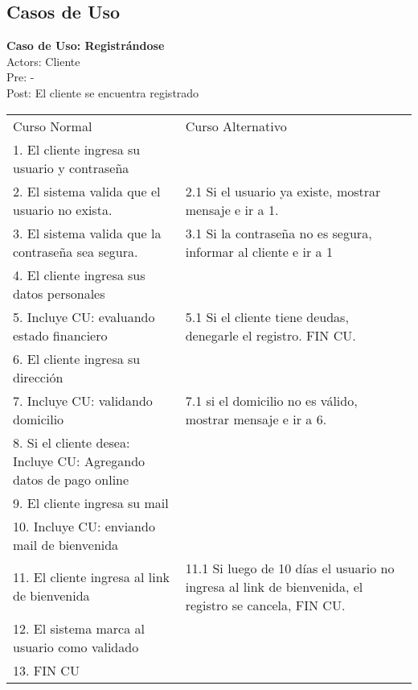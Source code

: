 \subsection{Casos de Uso}

\newcommand{\cutitle}[1]{\renewcommand{\givencutitle}{#1}}
\newcommand{\cuactors}[1]{\renewcommand{\givencuactors}{#1}}
\newcommand{\cupre}[1]{\renewcommand{\givencupre}{#1}}
\newcommand{\cupost}[1]{\renewcommand{\givencupost}{#1}}
\newcommand{\cucourse}[1]{\renewcommand{\givencucourse}{#1}}
\newcommand{\givencutitle}{REQUIRED!}
\newcommand{\givencuactors}{REQUIRED!}
\newcommand{\givencupre}{-}
\newcommand{\givencupost}{-}
\newcommand{\givencucourse}{REQUIRED!}

\newenvironment{casodeuso}
{\begin{flushleft}}
{\textbf{Caso de Uso: \givencutitle}\\
Actors: \givencuactors\\
Pre: \givencupre\\
Post: \givencupost\\
\begin{tabular}{ll}
Curso Normal & Curso Alternativo \\
\givencucourse
\end{tabular}
\end{flushleft}}
  
\begin{casodeuso}
  \cutitle{Registrándose}
  \cuactors{Cliente}
  \cupost{El cliente se encuentra registrado}
  \cucourse{
  1. El cliente ingresa su usuario y contraseña & \\
  2. El sistema valida que el usuario no exista. & 2.1 Si el usuario ya existe, mostrar mensaje e ir a 1. \\
  3. El sistema valida que la contraseña sea segura. & 3.1 Si la contraseña no es segura, informar al cliente e ir a 1 \\
  4. El cliente ingresa sus datos personales & \\
  5. Incluye CU: evaluando estado financiero & 5.1 Si el cliente tiene deudas, denegarle el registro. FIN CU. \\
  6. El cliente ingresa su dirección & \\
  7. Incluye CU: validando domicilio & 7.1 si el domicilio no es válido, mostrar mensaje e ir a 6.  \\
  8. Si el cliente desea: Incluye CU: Agregando datos de pago online & \\
  9. El cliente ingresa su mail & \\
  10. Incluye CU: enviando mail de bienvenida & \\
  11. El cliente ingresa al link de bienvenida & 11.1 Si luego de 10 días el usuario no ingresa al link de bienvenida, el registro se cancela, FIN CU.\\
  12. El sistema marca al usuario como validado & \\
  13. FIN CU & \\
  }
\end{casodeuso}

